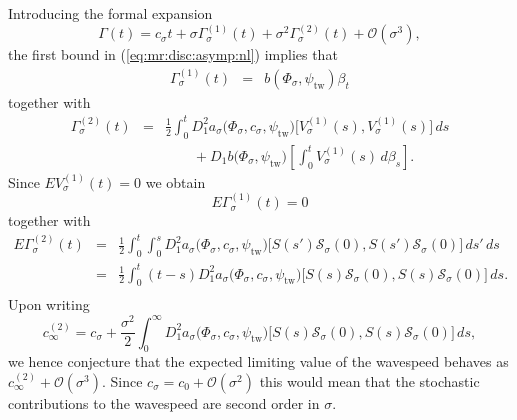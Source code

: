 \documentclass[10pt]{articleHJ}
\newcommand{\s}{\ensuremath{\sigma}}
\renewcommand{\O}{\ensuremath{\mathcal{O}}}
\newcommand{\sref}[1]{(\ref{#1})}                       %
\numberwithin{equation}{section}
\begin{document}
Introducing the formal expansion
\begin{equation}
\Gamma(t) = c_{\sigma} t + \sigma \Gamma^{(1)}_{\sigma}(t)
+ \sigma^2 \Gamma^{(2)}_{\sigma}(t) + \O(\sigma^3),
\end{equation}
the first bound in \sref{eq:mr:disc:asymp:nl}
implies that
\begin{equation}
\begin{array}{lcl}
\Gamma^{(1)}_{\sigma}(t)
 & = &  b(\Phi_{\sigma}, \psi_{\mathrm{tw}}) \beta_t
 \end{array}
\end{equation}
together with
\begin{equation}
\begin{array}{lcl}
\Gamma^{(2)}_{\sigma}(t)
  & = &
     \frac{1}{2}\int_0^t D^2_1 a_{\sigma}
     \big(\Phi_{\sigma} , c_{\sigma}, \psi_{\mathrm{tw}}  \big)
      \big[V_\s^{(1)}(s), V_\s^{(1)}(s) \big] \, ds
\\[0.2cm]
 & & \qquad
   +  D_1b\big(\Phi_{\sigma} , \psi_{\mathrm{tw}} \big)
   \left[\int_0^t V_\s^{(1)}(s) \, d \beta_s\right] .
\end{array}
\end{equation}
Since $E V^{(1)}_{\sigma}(t) = 0$ we obtain
\begin{equation}
 E \Gamma^{(1)}_{\sigma}(t) =  0 %
\end{equation}
together with
\begin{equation}
\begin{array}{lcl}
E \Gamma^{(2)}_{\sigma}(t)
  & = & \frac{1}{2}
\int_0^t \int_{0}^s D^2_1 a_{\sigma}
     \big(\Phi_{\sigma} , c_{\sigma}, \psi_{\mathrm{tw}}  \big)
      \big[ S(s') \mathcal{S}_{\sigma}(0), S(s') \mathcal{S}_{\sigma}(0)  \big]
      \, ds' \, ds
\\[0.2cm]
& = & \frac{1}{2} \int_0^t (t - s) D^2_1 a_{\sigma}
     \big(\Phi_{\sigma} , c_{\sigma}, \psi_{\mathrm{tw}}  \big)
      \big[ S(s) \mathcal{S}_{\sigma}(0), S(s) \mathcal{S}_{\sigma}(0)  \big]
       \, ds .
\\[0.2cm]
\end{array}
\end{equation}
Upon writing
\begin{equation}
\label{eq:mr:c:inft:order:two}
c_{\infty}^{(2)} = c_{\sigma} +
\frac{\sigma^2}{2} \int_0^\infty
D^2_1 a_{\sigma}
     \big(\Phi_{\sigma} , c_{\sigma}, \psi_{\mathrm{tw}}  \big)
      \big[S(s) \mathcal{S}_{\sigma}(0) , S(s) \mathcal{S}_{\sigma}(0) \big] \, ds,
\end{equation}
we hence conjecture that the expected limiting value
of the wavespeed behaves as
$c_{\infty}^{(2)} +\O (\sigma^3)$.
Since $c_{\sigma} = c_0 + \O(\sigma^2)$ this would mean that the stochastic contributions
to the wavespeed are second order in $\sigma$.
\end{document}
